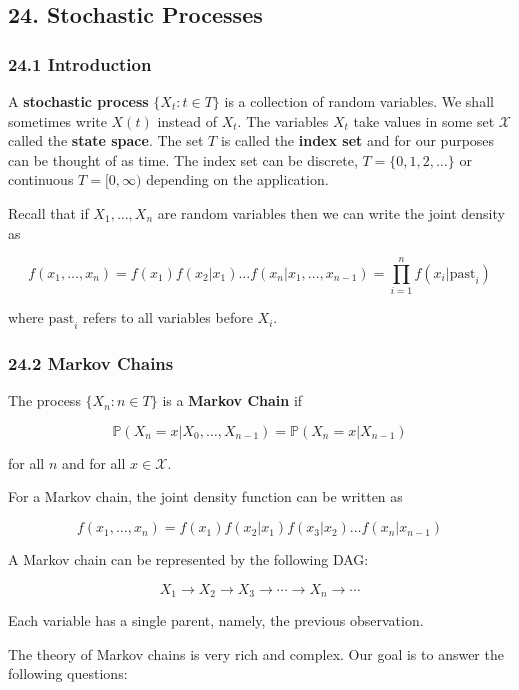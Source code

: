 \subsection{24. Stochastic Processes}\label{stochastic-processes}

\subsubsection{24.1 Introduction}\label{introduction}

A \textbf{stochastic process} \(\{ X_t : t \in T \}\) is a collection of
random variables. We shall sometimes write \(X(t)\) instead of \(X_t\).
The variables \(X_t\) take values in some set \(\mathcal{X}\) called the
\textbf{state space}. The set \(T\) is called the \textbf{index set} and
for our purposes can be thought of as time. The index set can be
discrete, \(T = \{0, 1, 2, \dots \}\) or continuous \(T = [0, \infty)\)
depending on the application.

Recall that if \(X_1, \dots, X_n\) are random variables then we can
write the joint density as

\[ f(x_1, \dots, x_n) = f(x_1) f(x_2 | x_1) \dots f(x_n | x_1, \dots, x_{n-1}) = \prod_{i=1}^n f(x_i | \text{past}_i) \]

where \(\text{past}_i\) refers to all variables before \(X_i\).

\subsubsection{24.2 Markov Chains}\label{markov-chains}

The process \(\{ X_n : n \in T \}\) is a \textbf{Markov Chain} if

\[ \mathbb{P}(X_n = x | X_0, \dots, X_{n-1}) = \mathbb{P}(X_n = x | X_{n-1})\]

for all \(n\) and for all \(x \in \mathcal{X}\).

For a Markov chain, the joint density function can be written as

\[ f(x_1, \dots, x_n) = f(x_1) f(x_2 | x_1) f(x_3 | x_2) \dots f(x_n | x_{n - 1}) \]

A Markov chain can be represented by the following DAG:

\[ X_1 \longrightarrow X_2 \longrightarrow X_3 \longrightarrow \cdots \longrightarrow X_n \longrightarrow \cdots \]

Each variable has a single parent, namely, the previous observation.

The theory of Markov chains is very rich and complex. Our goal is to
answer the following questions:

